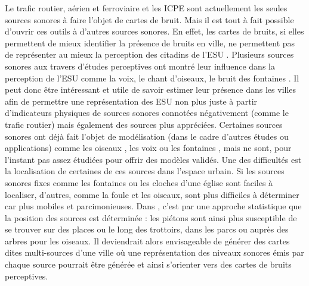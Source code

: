 Le trafic routier, aérien et ferroviaire et les ICPE sont actuellement les seules sources sonores à faire l'objet de cartes de bruit. Mais il est tout à fait possible d'ouvrir ces outils à d'autres sources sonores.
En effet, les cartes de bruits, si elles permettent de mieux identifier la présence de bruits en ville, ne permettent pas de représenter au mieux la perception des citadins de l'ESU \cite{brown2012review}. Plusieurs sources sonores aux travers d'études perceptives ont montré leur influence dans la perception de l'ESU comme la voix, le chant d'oiseaux, le bruit des fontaines \cite{lavandier2006contribution,hong2013designing}.
Il peut donc être intéressant et utile de savoir estimer leur présence dans les villes afin de permettre une représentation des ESU non plus juste à partir d'indicateurs physiques de sources sonores connotées négativement (comme le trafic routier) mais également des sources plus appréciées.
Certaines sources sonores ont déjà fait l'objet de modélisation (dans le cadre d'autres études ou applications) comme les oiseaux \cite{nemeth2013bird}, les voix \cite{hayne2011prediction} ou les fontaines \cite{watts2009measurement}, mais ne sont, pour l'instant pas assez étudiées pour offrir des modèles validés.
Une des difficultés est la localisation de certaines de ces sources dans l'espace urbain. Si les sources sonores fixes comme les fontaines ou les cloches d'une église sont faciles à localiser, d'autres, comme la foule et les oiseaux, sont plus difficiles à déterminer car plus mobiles et parcimonieuses. Dans \cite{aumond2018probabilistic}, c'est par une approche statistique que la position des sources est déterminée : les piétons sont ainsi plus susceptible de se trouver sur des places ou le long des trottoirs, dans les parcs ou auprès des arbres pour les oiseaux. Il deviendrait alors envisageable de générer des cartes dites multi-sources d'une ville où une représentation des niveaux sonores émis par chaque source pourrait être générée et ainsi s'orienter vers des cartes de bruits perceptives.



